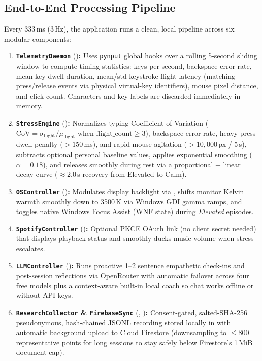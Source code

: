 \documentclass[11pt,a4paper]{article}
\begin{document}
\subsection{End-to-End Processing Pipeline}
Every 333\,ms (3\,Hz), the application runs a clean, local pipeline across six modular components:
\begin{enumerate}[leftmargin=1.6em, itemsep=2pt]
    \item \textbf{\texttt{TelemetryDaemon}} ()\textbf{:} Uses \texttt{pynput} global hooks over a rolling 5-second sliding window to compute timing statistics: keys per second, backspace error rate, mean key dwell duration, mean/std keystroke flight latency (matching press/release events via physical virtual-key identifiers), mouse pixel distance, and click count. Characters and key labels are discarded immediately in memory.
    \item \textbf{\texttt{StressEngine}} ()\textbf{:} Normalizes typing Coefficient of Variation ($\text{CoV} = \sigma_{\text{flight}} / \mu_{\text{flight}}$ when $\text{flight\_count} \ge 3$), backspace error rate, heavy-press dwell penalty ($>150$\,ms), and rapid mouse agitation ($>10{,}000$\,px / 5\,s), subtracts optional personal baseline values, applies exponential smoothing ($\alpha = 0.18$), and releases smoothly during rest via a proportional + linear decay curve ($\approx 2.0$\,s recovery from Elevated to Calm).
    \item \textbf{\texttt{OSController}} ()\textbf{:} Modulates display backlight via , shifts monitor Kelvin warmth smoothly down to 3500\,K via Windows GDI gamma ramps, and toggles native Windows Focus Assist (WNF state) during \textit{Elevated} episodes.
    \item \textbf{\texttt{SpotifyController}} ()\textbf{:} Optional PKCE OAuth link (no client secret needed) that displays playback status and smoothly ducks music volume when stress escalates.
    \item \textbf{\texttt{LLMController}} ()\textbf{:} Runs proactive 1--2 sentence empathetic check-ins and post-session reflections via OpenRouter with automatic failover across four free models plus a context-aware built-in local coach so chat works offline or without API keys.
    \item \textbf{\texttt{ResearchCollector} \& \texttt{FirebaseSync}} (, )\textbf{:} Consent-gated, salted-SHA-256 pseudonymous, hash-chained JSONL recording stored locally in  with automatic background upload to Cloud Firestore (downsampling  to $\le 800$ representative points for long sessions to stay safely below Firestore's 1\,MiB document cap).
\end{enumerate}
\end{document}
